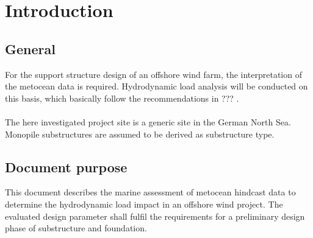\section{Introduction}
\subsection{General}
For the support structure design of an offshore wind farm, the interpretation of the metocean data is required.
Hydrodynamic load analysis will be conducted on this basis, which basically follow the recommendations in ???  .
\\
\\
The here investigated project site is a generic site in the German North Sea. Monopile substructures are assumed to be derived as substructure type.

\subsection{Document purpose}
This document describes the marine assessment of metocean hindcast data to determine the hydrodynamic load impact in an
offshore wind project. The evaluated design parameter shall fulfil the requirements for a preliminary design phase of
substructure and foundation.